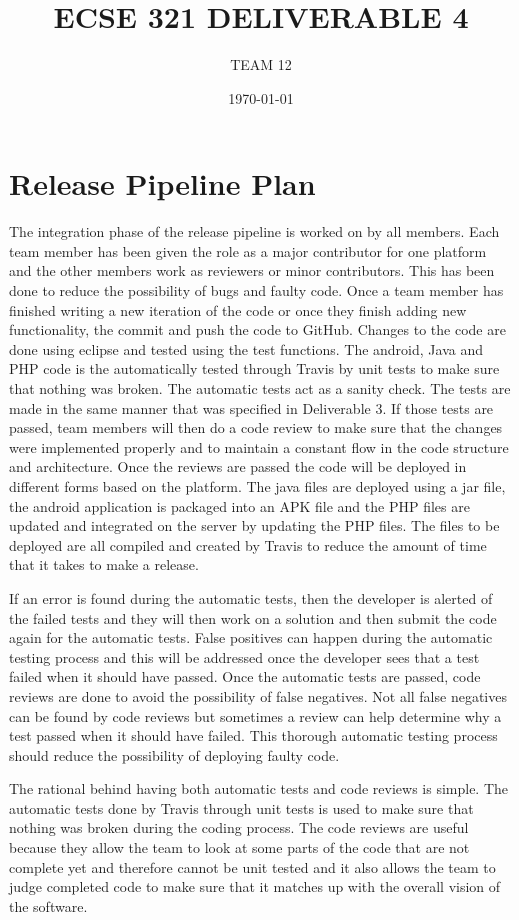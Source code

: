 \documentclass[12pt, letterpaper]{article}
\begin{document}
\title{ECSE 321 DELIVERABLE 4}
\author{TEAM 12}
\date{\today}
\maketitle

\section{Release Pipeline Plan}

The integration phase of the release pipeline is worked on by all members. Each team member has been given the role as a major contributor for one platform and the other members work as reviewers or minor contributors. This has been done to reduce the possibility of bugs and faulty code. Once a team member has finished writing a new iteration of the code or once they finish adding new functionality, the commit and push the code to GitHub. Changes to the code are done using eclipse and tested using the test functions. The android, Java and PHP code is the automatically tested through Travis by unit tests to make sure that nothing was broken. The automatic tests act as a sanity check. The tests are made in the same manner that was specified in Deliverable 3. If those tests are passed, team members will then do a code review to make sure that the changes were implemented properly and to maintain a constant flow in the code structure and architecture. Once the reviews are passed the code will be deployed in different forms based on the platform. The java files are deployed using a jar file, the android application is packaged into an APK file and the PHP files are updated and integrated on the server by updating the PHP files. The files to be deployed are all compiled and created by Travis to reduce the amount of time that it takes to make a release. 

If an error is found during the automatic tests, then the developer is alerted of the failed tests and they will then work on a solution and then submit the code again for the automatic tests. False positives can happen during the automatic testing process and this will be addressed once the developer sees that a test failed when it should have passed. Once the automatic tests are passed, code reviews are done to avoid the possibility of false negatives. Not all false negatives can be found by code reviews but sometimes a review can help determine why a test passed when it should have failed. This thorough automatic testing process should reduce the possibility of deploying faulty code.

The rational behind having both automatic tests and code reviews is simple. The automatic tests done by Travis through unit tests is used to make sure that nothing was broken during the coding process. The code reviews are useful because they allow the team to look at some parts of the code that are not complete yet and therefore cannot be unit tested and it also allows the team to judge completed code to make sure that it matches up with the overall vision of the software.
\end{document}
